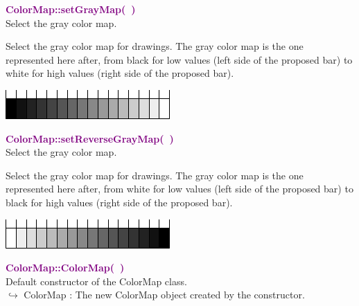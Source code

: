 \textcolor{purple}{\textbf{ColorMap::setGrayMap(~)}}\label{ColorMap::setGrayMap()}\\
Select the gray color map.

Select the gray color map for drawings.
The gray color map is the one represented here after, from black for low values (left side of the proposed bar) to white for high values (right side of the proposed bar).
\begin{center}
\includegraphics{Figures/ProgrammingLanguage/GrayMap}
\end{center}

\textcolor{purple}{\textbf{ColorMap::setReverseGrayMap(~)}}\label{ColorMap::setReverseGrayMap()}\\
Select the gray color map.

Select the gray color map for drawings.
The gray color map is the one represented here after, from white for low values (left side of the proposed bar) to black for high values (right side of the proposed bar).
\begin{center}
\includegraphics{Figures/ProgrammingLanguage/ReverseGrayMap}
\end{center}

\textcolor{purple}{\textbf{ColorMap::ColorMap(~)}}\label{ColorMap::ColorMap()}\\
Default constructor of the ColorMap class.\\ \hspace*{10mm}$\hookrightarrow$ ColorMap : The new ColorMap object created by the constructor.

